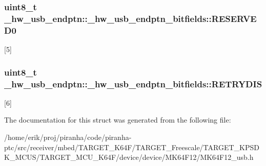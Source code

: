 \subsubsection[{\texorpdfstring{R\+E\+S\+E\+R\+V\+E\+D0}{RESERVED0}}]{\setlength{\rightskip}{0pt plus 5cm}uint8\+\_\+t \+\_\+hw\+\_\+usb\+\_\+endptn\+::\+\_\+hw\+\_\+usb\+\_\+endptn\+\_\+bitfields\+::\+R\+E\+S\+E\+R\+V\+E\+D0}\hypertarget{struct__hw__usb__endptn_1_1__hw__usb__endptn__bitfields_a7ec6e4f6bf0f993f7bd35c3db908f014}{}\label{struct__hw__usb__endptn_1_1__hw__usb__endptn__bitfields_a7ec6e4f6bf0f993f7bd35c3db908f014}
\mbox{[}5\mbox{]} 
\subsubsection[{\texorpdfstring{R\+E\+T\+R\+Y\+D\+IS}{RETRYDIS}}]{\setlength{\rightskip}{0pt plus 5cm}uint8\+\_\+t \+\_\+hw\+\_\+usb\+\_\+endptn\+::\+\_\+hw\+\_\+usb\+\_\+endptn\+\_\+bitfields\+::\+R\+E\+T\+R\+Y\+D\+IS}\hypertarget{struct__hw__usb__endptn_1_1__hw__usb__endptn__bitfields_a6903ff34a06f3bd6b964d9f814d55dc6}{}\label{struct__hw__usb__endptn_1_1__hw__usb__endptn__bitfields_a6903ff34a06f3bd6b964d9f814d55dc6}
\mbox{[}6\mbox{]} 

The documentation for this struct was generated from the following file\+:\begin{DoxyCompactItemize}
\item 
/home/erik/proj/piranha/code/piranha-\/ptc/src/receiver/mbed/\+T\+A\+R\+G\+E\+T\+\_\+\+K64\+F/\+T\+A\+R\+G\+E\+T\+\_\+\+Freescale/\+T\+A\+R\+G\+E\+T\+\_\+\+K\+P\+S\+D\+K\+\_\+\+M\+C\+U\+S/\+T\+A\+R\+G\+E\+T\+\_\+\+M\+C\+U\+\_\+\+K64\+F/device/device/\+M\+K64\+F12/M\+K64\+F12\+\_\+usb.\+h\end{DoxyCompactItemize}
